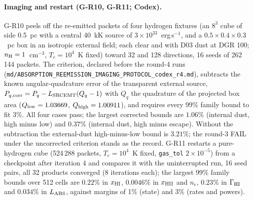 \documentclass[english,a4paper]{my_memo}
\newcommand{\code}[1]{\texttt{#1}}
\begin{document}
\paragraph{Imaging and restart (G-R10, G-R11; Codex).}  G-R10 peels off
the re-emitted packets of four hydrogen fixtures (an $8^3$ cube of side
0.5~pc with a central 40~kK source of $3\times10^{33}$~erg\,s$^{-1}$, and a
$0.5\times0.4\times0.3$~pc box in an isotropic external field; each clear
and with D03 dust at DGR 100; $n_{\rm H}=1$~cm$^{-3}$, $T_e=10^4$~K fixed)
toward 32 and 128 directions, 16 seeds of 262\,144 packets.  The criterion,
declared before the round-4 runs
(\code{md/\allowbreak ABSORPTION\_REEMISSION\_\allowbreak IMAGING\_PROTOCOL\_codex\_r4.md}),
subtracts the known angular-quadrature error of the transparent external
source, $P_{q,\rm corr}=P_{q}-L_{\rm SRCEMT}(Q_q-1)$ with $Q_q$ the quadrature
of the projected box area ($Q_{\rm low}=1.03669$, $Q_{\rm high}=1.00911$),
and requires every 99\% family bound to fit 3\%.  All four cases pass; the
largest corrected bounds are $1.06\%$ (internal dust, high minus low) and
$0.37\%$ (internal dust, high minus escape).  Without the subtraction the
external-dust high-minus-low bound is $3.21\%$; the round-3 FAIL under the
uncorrected criterion stands as the record.  G-R11 restarts a pure-hydrogen
cube (524\,288 packets, $T_e=10^4$~K fixed, \code{gas\_tol} $2\times10^{-5}$)
from a checkpoint after iteration 4 and compares it with the uninterrupted
run, 16 seed pairs, all 32 products converged (8 iterations each); the
largest 99\% family bounds over 512 cells are $0.22\%$ in $x_{\rm HI}$,
$0.0046\%$ in $x_{\rm HII}$ and $n_e$, $0.23\%$ in $\Gamma_{\rm HI}$ and
$0.034\%$ in $L_{\rm ABS}$, against margins of 1\% (state) and 3\% (rates
and powers).
\end{document}
